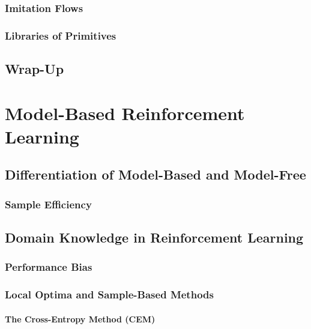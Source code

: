 		\subsection{Imitation Flows} %

		\subsection{Libraries of Primitives} %

	\section{Wrap-Up} %

\chapter{Model-Based Reinforcement Learning} %

	\section{Differentiation of Model-Based and Model-Free} %

		\subsection{Sample Efficiency} %

	\section{Domain Knowledge in Reinforcement Learning} %

		\subsection{Performance Bias} %

		\subsection{Local Optima and Sample-Based Methods} %

			\subsubsection{The Cross-Entropy Method (CEM)} %

